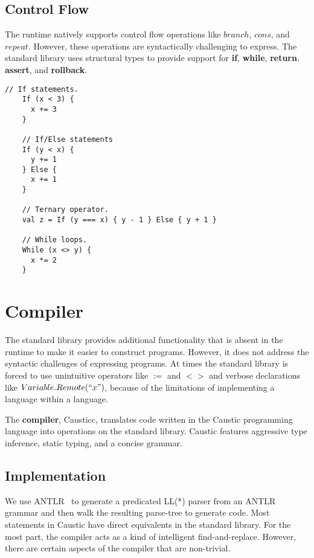 \documentclass[../main.tex]{subfiles}
\begin{document}
  \subsection{Control Flow}
  The runtime natively supports control flow operations like $branch$, $cons$, and $repeat$.
  However, these operations are syntactically challenging to express. The standard library
  uses structural types to provide support for \textbf{if}, \textbf{while}, \textbf{return},
  \textbf{assert}, and \textbf{rollback}.

  \begin{lstlisting}[style=Scala]
    // If statements.
    If (x < 3) {
      x += 3
    }

    // If/Else statements
    If (y < x) {
      y += 1
    } Else {
      x += 1
    }

    // Ternary operator.
    val z = If (y === x) { y - 1 } Else { y + 1 }

    // While loops.
    While (x <> y) {
      x *= 2
    }
  \end{lstlisting}

\section{Compiler}
The standard library provides additional functionality that is absent in the runtime to make it
easier to construct programs. However, it does not address the syntactic challenges of expressing
programs. At times the standard library is forced to use unintuitive operators like $:=$ and $<>$
and verbose declarations like $Variable.Remote(``x")$, because of the limitations of implementing a
language within a language.

The \textbf{compiler}, Causticc, translates code written in the Caustic programming language
into operations on the standard library. Caustic features aggressive type inference, static typing,
and a concise grammar.

  \subsection{Implementation}
  We use ANTLR~\cite{antlr} to generate a predicated LL(*) parser from an ANTLR grammar and then
  walk the resulting parse-tree to generate code. Most statements in Caustic have direct equivalents
  in the standard library. For the most part, the compiler acts as a kind of intelligent
  find-and-replace. However, there are certain aspects of the compiler that are non-trivial.
\end{document}
